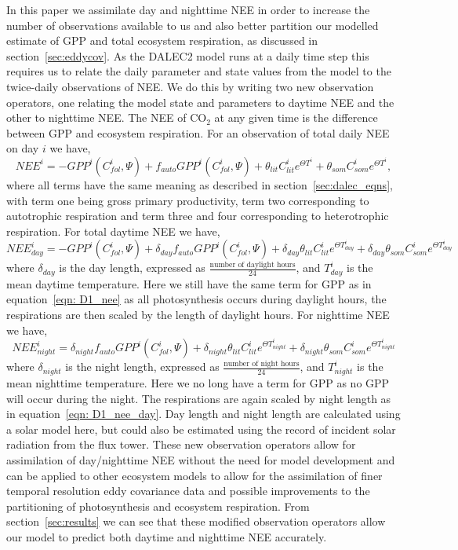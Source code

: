 \documentclass[11pt]{article}
\begin{document}
In this paper we assimilate day and nighttime NEE in order to increase the number of observations available to us and also better partition our modelled estimate of GPP and total ecosystem respiration, as discussed in section~\ref{sec:eddycov}. As the DALEC2 model runs at a daily time step this requires us to relate the daily parameter and state values from the model to the twice-daily observations of NEE. We do this by writing two new observation operators, one relating the model state and parameters to daytime NEE and the other to nighttime NEE. The NEE of CO\(_{2}\) at any given time is the difference between GPP and ecosystem respiration. For an observation of total daily NEE on day \(i\) we have,
\begin{equation}
NEE^{i}=-GPP^{i}(C_{fol}^{i}, \Psi) +f_{auto}GPP^{i}(C_{fol}^{i}, \Psi) + \theta_{lit}C_{lit}^i e^{\Theta T^{i}} + \theta_{som}C_{som}^i e^{\Theta T^{i}}, \label{eqn: D1_nee}
\end{equation}
where all terms have the same meaning as described in section~\ref{sec:dalec_eqns}, with term one being gross primary productivity, term two corresponding to autotrophic respiration and term three and four corresponding to heterotrophic respiration. For total daytime NEE we have,
\begin{equation}
NEE_{day}^{i} = -GPP^{i}(C_{fol}^{i}, \Psi) + \delta_{day}f_{auto}GPP^{i}(C_{fol}^{i}, \Psi) + \delta_{day}\theta_{lit}C_{lit}^i e^{\Theta T_{day}^{i}} + \delta_{day}\theta_{som}C_{som}^i e^{\Theta T_{day}^{i}} \label{eqn: D1_nee_day}
\end{equation}
where \(\delta_{day}\) is the day length, expressed as \(\frac{\text{number of daylight hours}}{24}\), and \(T_{day}^{i}\) is the mean daytime temperature. Here we still have the same term for GPP as in equation~\eqref{eqn: D1_nee} as all photosynthesis occurs during daylight hours, the respirations are then scaled by the length of daylight hours. For nighttime NEE we have,
\begin{equation}
NEE_{night}^{i} =  \delta_{night}f_{auto}GPP^{i}(C_{fol}^{i}, \Psi) + \delta_{night}\theta_{lit}C_{lit}^i e^{\Theta T_{night}^{i}} + \delta_{night}\theta_{som}C_{som}^i e^{\Theta T_{night}^{i}} \label{eqn: D1_nee_night}
\end{equation}
where \(\delta_{night}\) is the night length, expressed as \(\frac{\text{number of night hours}}{24}\), and \(T_{night}^{i}\) is the mean nighttime temperature. Here we no long have a term for GPP as no GPP will occur during the night. The respirations are again scaled by night length as in equation~\eqref{eqn: D1_nee_day}. Day length and night length are calculated using a solar model here, but could also be estimated using the record of incident solar radiation from the flux tower. These new observation operators allow for assimilation of day/nighttime NEE without the need for model development and can be applied to other ecosystem models to allow for the assimilation of finer temporal resolution eddy covariance data and possible improvements to the partitioning of photosynthesis and ecosystem respiration. From section~\ref{sec:results} we can see that these modified observation operators allow our model to predict both daytime and nighttime NEE accurately.
\end{document}
